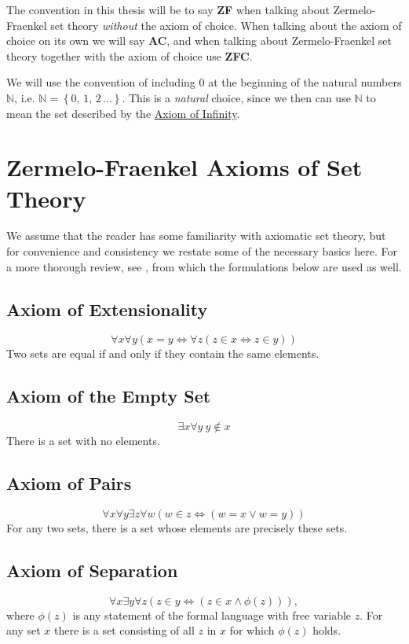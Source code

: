 \documentclass[../../main.tex]{subfiles}
\begin{document}
The convention in this thesis will be to say \textbf{ZF} when talking about Zermelo-Fraenkel set theory \textit{without} the axiom of choice.
When talking about the axiom of choice on its own we will say \textbf{AC}, and when talking about Zermelo-Fraenkel set theory together with the axiom of choice use \textbf{ZFC}.

We will use the convention of including $0$ at the beginning of the natural numbers $\mathbb{N}$, i.e. $\mathbb{N} = \left\{0, \, 1, \, 2\, \ldots\right\}$.
This is a \textit{natural} choice, since we then can use $\mathbb{N}$ to mean the set described by the \hyperref[ZF7]{Axiom of Infinity}.

\section{Zermelo-Fraenkel Axioms of Set Theory}
We assume that the reader has some familiarity with axiomatic set theory, but for convenience and consistency we restate some of the necessary basics here. %
For a more thorough review, see \cite{Gol17}, from which the formulations below are used as well.

\subsection{Axiom of Extensionality}
$$\forall x \forall y \left(x = y \iff \forall z \left(z \in x \iff z \in y\right) \right)$$
Two sets are equal if and only if they contain the same elements.

\subsection{Axiom of the Empty Set}
$$\exists x \forall y \ y \notin x$$
There is a set with no elements.

\subsection{Axiom of Pairs}
$$\forall x \forall y \exists z \forall w \left( w \in z \iff \left(w = x \vee w = y \right)\right)$$
For any two sets, there is a set whose elements are precisely these sets.

\subsection{Axiom of Separation}
$$\forall x \exists y \forall z \left(z \in y \iff \left(z \in x \wedge \phi(z)\right)\right),$$
where $\phi(z)$ is any statement of the formal language with free variable $z$.
For any set $x$ there is a set consisting of all $z$ in $x$ for which $\phi(z)$ holds.
\end{document}
